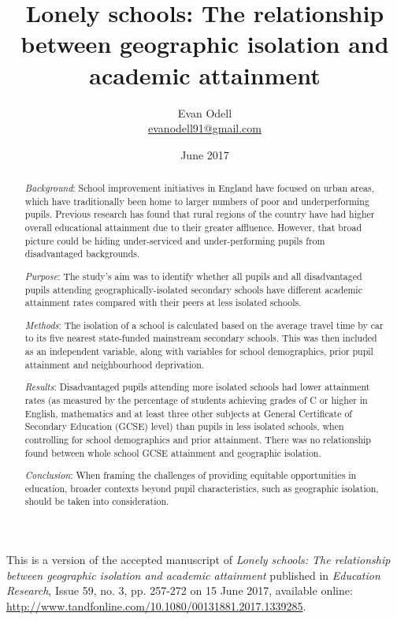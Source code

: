 \documentclass[12pt, a4paper]{article}
\title{{\Huge Lonely schools: The relationship between geographic isolation and academic attainment}}
\author{Evan Odell \\ \href{mailto: evanodell91@gmail.com}{evanodell91@gmail.com}}
\date{June 2017}
\begin{document}
\maketitle

This is a version of the accepted manuscript of \emph{Lonely schools: The relationship between geographic isolation and academic attainment} published in \emph{Education Research}, Issue 59, no. 3, pp. 257-272 on 15 June 2017, available online: \url{http://www.tandfonline.com/10.1080/00131881.2017.1339285}.


\begin{abstract}
\noindent\emph{Background}: School improvement initiatives in England have focused on urban areas, which have traditionally been home to larger numbers of poor and underperforming pupils. Previous research has found that rural regions of the country have had higher overall educational attainment due to their greater affluence. However, that broad picture could be hiding under-serviced and under-performing pupils from disadvantaged backgrounds.
	 
\noindent\emph{Purpose}: The study's aim was to identify whether all pupils and all disadvantaged pupils attending geographically-isolated secondary schools have different academic attainment rates compared with their peers at less isolated schools. 
	
\noindent\emph{Methods}: The isolation of a school is calculated based on the average travel time by car to its five nearest state-funded mainstream secondary schools. This was then included as an independent variable, along with variables for school demographics, prior pupil attainment and neighbourhood deprivation. 
	
\noindent\emph{Results}: Disadvantaged pupils attending more isolated schools had lower attainment rates (as measured by the percentage of students achieving grades of C or higher in English, mathematics and at least three other subjects at General Certificate of Secondary Education (GCSE) level) than pupils in less isolated schools, when controlling for school demographics and prior attainment. There was no relationship found between whole school GCSE attainment and geographic isolation. 
	
\noindent\emph{Conclusion}: When framing the challenges of providing equitable opportunities in education, broader contexts beyond pupil characteristics, such as geographic isolation, should be taken into consideration.
\end{abstract}
\end{document}
